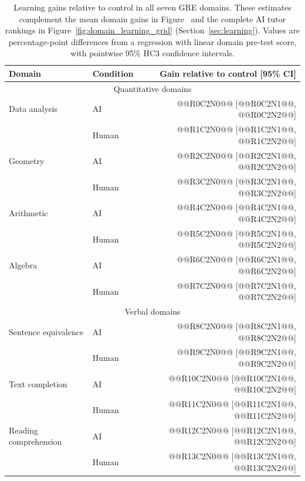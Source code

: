 \begin{table}[!tbp]
    \centering
    \setlength{\tabcolsep}{2.25pt}
    \caption{Learning gains relative to control in all seven GRE domains. These estimates complement the mean domain gains in Figure~ and the complete AI tutor rankings in Figure~\ref{fig:domain_learning_grid} (Section~\ref{sec:learning}). Values are percentage-point differences from a regression with linear domain pre-test score, with pointwise 95\% HC3 confidence intervals.}
    \label{tab:domain_learning_contrasts}
    \begin{tabular}{llr}
    \toprule
    Domain & Condition & Gain relative to control [95\% CI] \\
    \midrule
    \multicolumn{3}{c}{Quantitative domains} \\
    \midrule
    Data analysis & AI & @@R0C2N0@@ [@@R0C2N1@@, @@R0C2N2@@] \\
     & Human & @@R1C2N0@@ [@@R1C2N1@@, @@R1C2N2@@] \\
    Geometry & AI & @@R2C2N0@@ [@@R2C2N1@@, @@R2C2N2@@] \\
     & Human & @@R3C2N0@@ [@@R3C2N1@@, @@R3C2N2@@] \\
    Arithmetic & AI & @@R4C2N0@@ [@@R4C2N1@@, @@R4C2N2@@] \\
     & Human & @@R5C2N0@@ [@@R5C2N1@@, @@R5C2N2@@] \\
    Algebra & AI & @@R6C2N0@@ [@@R6C2N1@@, @@R6C2N2@@] \\
     & Human & @@R7C2N0@@ [@@R7C2N1@@, @@R7C2N2@@] \\
    \midrule
    \multicolumn{3}{c}{Verbal domains} \\
    \midrule
    Sentence equivalence & AI & @@R8C2N0@@ [@@R8C2N1@@, @@R8C2N2@@] \\
     & Human & @@R9C2N0@@ [@@R9C2N1@@, @@R9C2N2@@] \\
    Text completion & AI & @@R10C2N0@@ [@@R10C2N1@@, @@R10C2N2@@] \\
     & Human & @@R11C2N0@@ [@@R11C2N1@@, @@R11C2N2@@] \\
    Reading comprehension & AI & @@R12C2N0@@ [@@R12C2N1@@, @@R12C2N2@@] \\
     & Human & @@R13C2N0@@ [@@R13C2N1@@, @@R13C2N2@@] \\
    \bottomrule
    \end{tabular}
\end{table}